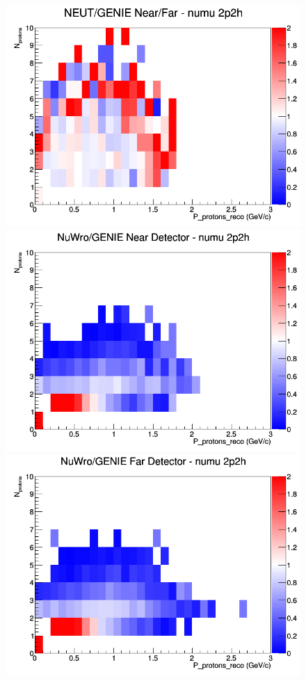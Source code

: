 \documentclass[12pt]{article}
\begin{document}
\begin{figure}[h]
\endminipage
{}
\includegraphics[width=\linewidth]{eff_N_P/LAr/protons/ratios/2p2h_NEUT_GENIE_numu_NF_N_P.png}
\endminipage
\newline
{}
\includegraphics[width=\linewidth]{eff_N_P/LAr/protons/ratios/2p2h_NuWro_GENIE_numu_near_N_P.png}
\endminipage
{}
\includegraphics[width=\linewidth]{eff_N_P/LAr/protons/ratios/2p2h_NuWro_GENIE_numu_far_N_P.png}

\end{figure}
\end{document}
